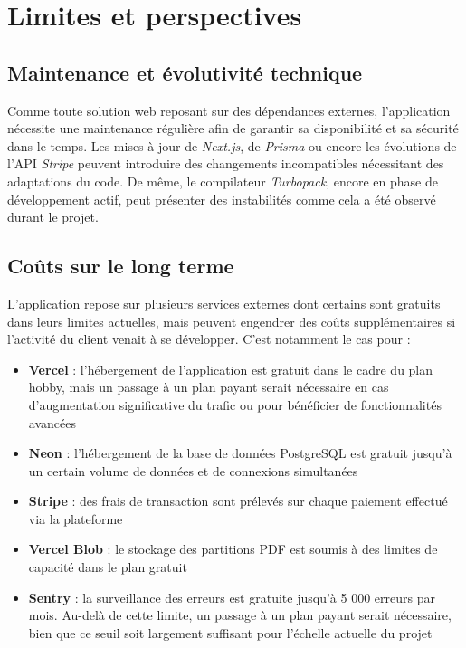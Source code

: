 \documentclass{article}
\begin{document}
\section{Limites et perspectives}


\subsection{Maintenance et évolutivité technique}

Comme toute solution web reposant sur des dépendances externes, 
l'application nécessite une maintenance régulière afin de garantir 
sa disponibilité et sa sécurité dans le temps. Les mises à jour de 
\textit{Next.js}, de \textit{Prisma} ou encore les évolutions de 
l'API \textit{Stripe} peuvent introduire des changements incompatibles 
nécessitant des adaptations du code. De même, le compilateur 
\textit{Turbopack}, encore en phase de développement actif, peut 
présenter des instabilités comme cela a été observé durant le projet.

\subsection{Coûts sur le long terme}

L'application repose sur plusieurs services externes dont certains 
sont gratuits dans leurs limites actuelles, mais peuvent engendrer 
des coûts supplémentaires si l'activité du client venait à se 
développer. C'est notamment le cas pour :

\begin{itemize}
    \item \textbf{Vercel} : l'hébergement de l'application est 
    gratuit dans le cadre du plan hobby, mais un passage à un plan 
    payant serait nécessaire en cas d'augmentation significative 
    du trafic ou pour bénéficier de fonctionnalités avancées
    \item \textbf{Neon} : l'hébergement de la base de données 
    PostgreSQL est gratuit jusqu'à un certain volume de données 
    et de connexions simultanées
    \item \textbf{Stripe} : des frais de transaction sont prélevés 
    sur chaque paiement effectué via la plateforme
    \item \textbf{Vercel Blob} : le stockage des partitions PDF 
    est soumis à des limites de capacité dans le plan gratuit
    \item \textbf{Sentry} : la surveillance des erreurs est 
    gratuite jusqu'à 5 000 erreurs par mois. Au-delà de 
    cette limite, un passage à un plan payant serait 
    nécessaire, bien que ce seuil soit largement suffisant 
    pour l'échelle actuelle du projet
\end{itemize}
\end{document}
